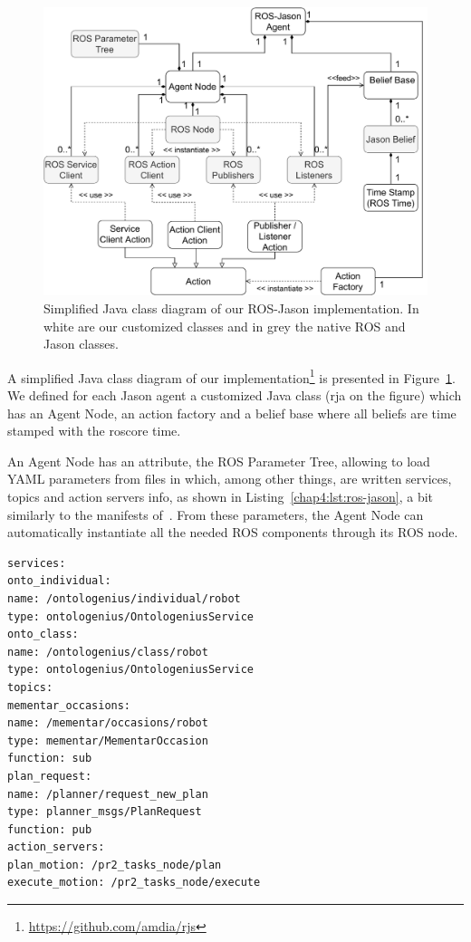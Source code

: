 \documentclass[a4paper,11pt,twoside]{StyleThese}
\begin{document}
\begin{figure}[!ht]
	\includegraphics[width=\linewidth]{figures/chapter2/RJS_diagram.pdf}
	\caption{Simplified Java class diagram of our ROS-Jason implementation. In white are our customized classes and in grey the native ROS and Jason classes.}
	\label{chap4:fig:rjs}
\end{figure}

A simplified Java class diagram of our  implementation\footnote{\url{https://github.com/amdia/rjs}} is presented in Figure~\ref{chap4:fig:rjs}. We defined for each Jason agent a customized Java class (\acrfull{rja} on the figure) which has an Agent Node, an action factory and a belief base where all beliefs are time stamped with the roscore time. 

An Agent Node has an attribute, the ROS Parameter Tree, allowing to load YAML parameters from files in which, among other things, are written services, topics and action servers info, as shown in Listing~\ref{chap4:lst:ros-jason}, a bit similarly to the manifests of~\cite{silva_2020_embedded}. From these parameters, the Agent Node can automatically instantiate all the needed ROS components through its ROS node. 

\begin{lstlisting}[caption={Example of service, topic and action server definitions in a YAML file.}, label={chap4:lst:ros-jason}]
services:
onto_individual: 
name: /ontologenius/individual/robot
type: ontologenius/OntologeniusService
onto_class: 
name: /ontologenius/class/robot
type: ontologenius/OntologeniusService
topics:
mementar_occasions: 
name: /mementar/occasions/robot
type: mementar/MementarOccasion
function: sub
plan_request:
name: /planner/request_new_plan
type: planner_msgs/PlanRequest
function: pub
action_servers:
plan_motion: /pr2_tasks_node/plan
execute_motion: /pr2_tasks_node/execute
\end{lstlisting}
\end{document}
